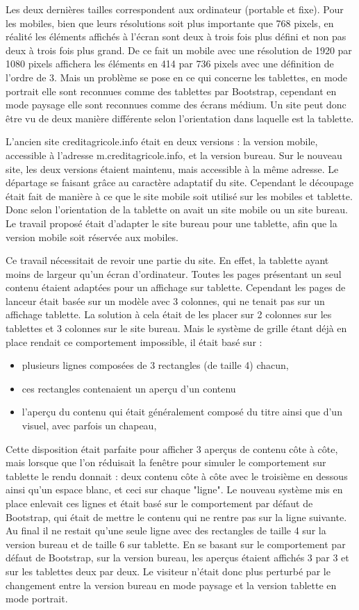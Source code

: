 \documentclass[12pt,a4paper]{article}
\begin{document}
Les deux dernières tailles correspondent aux ordinateur (portable et fixe). Pour les mobiles, bien que leurs résolutions soit plus importante que 768 pixels, en réalité les éléments affichés à l'écran sont deux à trois fois plus défini et non pas deux à trois fois plus grand. De ce fait un mobile avec une résolution de 1920 par 1080 pixels affichera les éléments en 414 par 736 pixels avec une définition de l'ordre de 3. Mais un problème se pose en ce qui concerne les tablettes, en mode portrait elle sont reconnues comme des tablettes par Bootstrap, cependant en mode paysage elle sont reconnues comme des écrans médium. Un site peut donc être vu de deux manière différente selon l'orientation dans laquelle est la tablette.\par
\bigskip
L'ancien site creditagricole.info était en deux versions : la version mobile, accessible à l'adresse m.creditagricole.info, et la version bureau. Sur le nouveau site, les deux versions étaient maintenu, mais accessible à la même adresse. Le départage se faisant grâce au caractère adaptatif du site. Cependant le découpage était fait de manière à ce que le site mobile soit utilisé sur les mobiles et tablette. Donc selon l'orientation de la tablette on avait un site mobile ou un site bureau. Le travail proposé était d'adapter le site bureau pour une tablette, afin que la version mobile soit réservée aux mobiles.\par
Ce travail nécessitait de revoir une partie du site. En effet, la tablette ayant moins de largeur qu'un écran d'ordinateur. Toutes les pages présentant un seul contenu étaient adaptées pour un affichage sur tablette. Cependant les pages de lanceur était basée sur un modèle avec 3 colonnes, qui ne tenait pas sur un affichage tablette. La solution à cela était de les placer sur 2 colonnes sur les tablettes et 3 colonnes sur le site bureau. Mais le système de grille étant déjà en place rendait ce comportement impossible, il était basé sur :
\begin{itemize}
\item plusieurs lignes composées de 3 rectangles (de taille 4) chacun,
\item ces rectangles contenaient un aperçu d'un contenu
\item l'aperçu du contenu qui était généralement composé du titre ainsi que d'un visuel, avec parfois un chapeau,
\end{itemize}
Cette disposition était parfaite pour afficher 3 aperçus de contenu côte à côte, mais lorsque que l'on réduisait la fenêtre pour simuler le comportement sur tablette le rendu donnait : deux contenu côte à côte avec le troisième en dessous ainsi qu'un espace blanc, et ceci sur chaque "ligne". Le nouveau système mis en place enlevait ces lignes et était basé sur le comportement par défaut de Bootstrap, qui était de mettre le contenu qui ne rentre pas sur la ligne suivante. Au final il ne restait qu'une seule ligne avec des rectangles de taille 4 sur la version bureau et de taille 6 sur tablette. En se basant sur le comportement par défaut de Bootstrap, sur la version bureau, les aperçus étaient affichés 3 par 3 et sur les tablettes deux par deux. Le visiteur n'était donc plus perturbé par le changement entre la version bureau en mode paysage et la version tablette en mode portrait.\par
\end{document}
